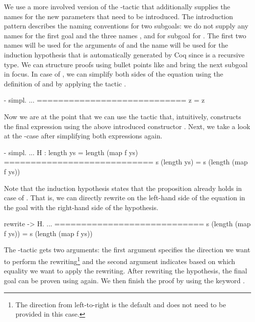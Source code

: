 We use a more involved version of the -tactic that additionally supplies the names for the new parameters that need to be introduced.
The introduction pattern \cinl{[ | y ys H ]} describes the naming conventions for two subgoals: we do not supply any names for the first goal and the three names ,  and  for subgoal for .
The first two names will be used for the arguments of  and the name  will be used for the induction hypothesis that is automatically generated by Coq since  is a recursive type.
We can structure proofs using bullet points like \cinl{-,+,*} and bring the next subgoal in focus.
In case of , we can simplify both sides of the equation using the definition of  and  by applying the tactic .

\begin{cproof}{- simpl.}
  ...
  ============================
  z = z
\end{cproof}

Now we are at the point that we can use the tactic  that, intuitively, constructs the final expression using the above introduced constructor .
Next, we take a look at the -case after simplifying both expressions again.

\begin{cproof}{- simpl.}
  ...
  H : length ys = length (map f ys)
  ============================
  s (length ys) = s (length (map f ys))
\end{cproof}

Note that the induction hypothesis  states that the proposition already holds in case of .
That is, we can directly rewrite  on the left-hand side of the equation in the goal with the right-hand side of the hypothesis.

\begin{cproof}{rewrite -> H.}
  ...
  ============================
  s (length (map f ys)) =
  s (length (map f ys))
\end{cproof}

The -tactic gets two arguments: the first argument specifies the direction we want to perform the rewriting\footnote{The direction from left-to-right is the default and does not need to be provided in this case.} and the second argument indicates based on which equality we want to apply the rewriting.
After rewriting the hypothesis, the final goal can be proven using  again.
We then finish the proof by using the keyword .

